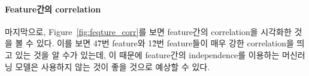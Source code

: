 \documentclass[ba]{imsart}
\begin{document}
\paragraph{Feature간의 correlation}
마지막으로, Figure~\ref{fig:feqture_corr}를 보면 feature간의 correlation을 시각화한 것을 볼 수 있다.
이를 보면 4\~7번 feature와 1\~2번 feature들이 매우 강한 correlation을 띄고 있는 것을 알 수가 있는데, 이 때문에 feature간의 independence를 이용하는 머신러닝 모델은 사용하지 않는 것이 좋을 것으로 예상할 수 있다.


\end{document}
